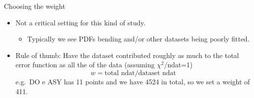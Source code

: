 \author[Zahari Kassabov]{}
\begin{frame}{Choosing the weight}
\protect\hypertarget{choosing-the-weight}{}
\begin{itemize}
\tightlist
\item
  Not a critical setting for this kind of study.

  \begin{itemize}
  \tightlist
  \item
    Typically we see PDFs bending and/or other datasets being poorly
    fitted.
  \end{itemize}
\item
  Rule of thumb: Have the dataset contributed roughly as much to the
  total error function as all the of the data (assuming
  \(\chi^2\)/ndat=1) \[
  w = \text{total ndat}/\text{dataset ndat}
  \] e.g.~DO e ASY has 11 points and we have 4524 in total, so we set a
  weight of 411.

\end{itemize}
\end{frame}
